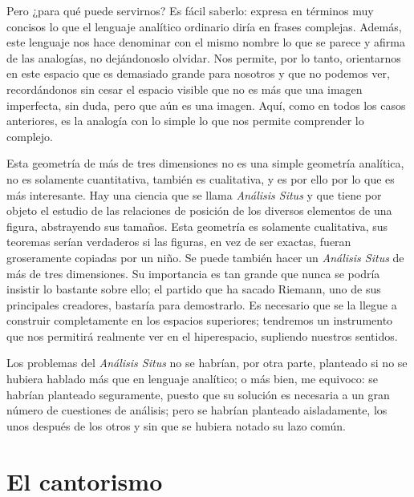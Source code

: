 \documentclass[a4paper, 12pt]{article}
\begin{document}
Pero ¿para qué puede servirnos? Es fácil saberlo: expresa en términos muy concisos lo que el lenguaje analítico ordinario diría
en frases complejas. Además, este lenguaje nos hace denominar con el
mismo nombre lo que se parece y afirma de las analogías, no dejándonoslo olvidar. Nos permite, por lo tanto, orientarnos en este espacio que
es demasiado grande para nosotros y que no podemos ver, recordándonos
sin cesar el espacio visible que no es más que una imagen imperfecta,
sin duda, pero que aún es una imagen. Aquí, como en todos los casos
anteriores, es la analogía con lo simple lo que nos permite comprender
lo complejo.

Esta geometría de más de tres dimensiones no es una simple geometría analítica, no es solamente cuantitativa, también es
cualitativa, y es por ello por lo que es más interesante. Hay una
ciencia que se llama {\it Análisis Situs} y que tiene por objeto el estudio de
las relaciones de posición de los diversos elementos de una figura,
abstrayendo sus tamaños. Esta geometría es solamente cualitativa,
sus teoremas serían verdaderos si las figuras, en vez de ser exactas,
fueran groseramente copiadas por un niño. Se puede también hacer un {\it Análisis Situs} de más de tres dimensiones. Su importancia es tan grande que nunca se podría insistir lo bastante sobre ello; el partido que ha sacado Riemann,
uno de sus principales creadores, bastaría para demostrarlo. Es
necesario que se la llegue a construir completamente en los espacios
superiores; tendremos un instrumento que nos permitirá realmente ver
en el hiperespacio, supliendo nuestros sentidos.

Los problemas del {\it Análisis Situs} no se habrían, por otra parte,
planteado si no se hubiera hablado más que en lenguaje analítico; o más bien, me equivoco: se habrían planteado seguramente, puesto que
su solución es necesaria a un gran número de cuestiones de análisis; pero se habrían planteado aisladamente, los unos después de
los otros y sin que se hubiera notado su lazo común.


\section*{El cantorismo}
\end{document}
